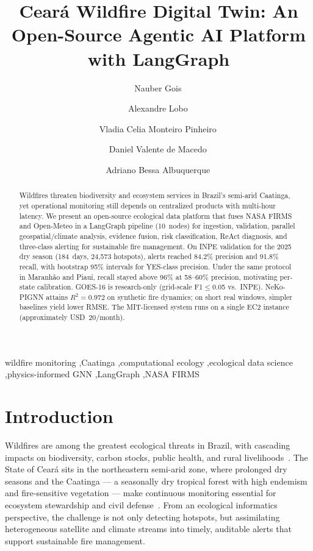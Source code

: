\documentclass[preprint,12pt,times,numbers]{elsarticle}
\title{Ceará Wildfire Digital Twin: An Open-Source Agentic AI Platform with LangGraph}
\author[unifor,cor1]{Nauber Gois\corref{cor1}\,\orcidlink{0000-0001-9361-8659}}
\author[usj]{Alexandre Lobo\,\orcidlink{0009-0000-4099-7878}}
\author[ifce]{Vladia Celia Monteiro Pinheiro\,\orcidlink{0000-0002-9851-8304}}
\author[saxion]{Daniel Valente de Macedo\,\orcidlink{0000-0003-4720-6850}}
\author[unifor]{Adriano Bessa Albuquerque\,\orcidlink{0000-0002-1491-655X}}
\begin{document}
\begin{frontmatter}

\begin{abstract}
Wildfires threaten biodiversity and ecosystem services in Brazil's semi-arid Caatinga, yet operational monitoring still depends on centralized products with multi-hour latency. We present an open-source ecological data platform that fuses NASA FIRMS and Open-Meteo in a LangGraph pipeline (10~nodes) for ingestion, validation, parallel geospatial/climate analysis, evidence fusion, risk classification, ReAct diagnosis, and three-class alerting for sustainable fire management. On INPE validation for the 2025 dry season (184~days, 24{,}573 hotspots), alerts reached 84.2\% precision and 91.8\% recall, with bootstrap 95\% intervals for YES-class precision. Under the same protocol in Maranh\~{a}o and Piau\'{i}, recall stayed above 96\% at 58--60\% precision, motivating per-state calibration. GOES-16 is research-only (grid-scale F1$\leq$0.05 vs.\ INPE). NeKo-PIGNN attains $R^2=0.972$ on synthetic fire dynamics; on short real windows, simpler baselines yield lower RMSE. The MIT-licensed system runs on a single EC2 instance (approximately USD~20/month).
\end{abstract}

\begin{keyword}
wildfire monitoring \sep Caatinga \sep computational ecology \sep ecological data science \sep physics-informed GNN \sep LangGraph \sep NASA FIRMS
\end{keyword}

\end{frontmatter}

\section{Introduction}
\label{sec:intro}

Wildfires are among the greatest ecological threats in Brazil, with cascading impacts on biodiversity, carbon stocks, public health, and rural livelihoods~\cite{article:pivello2021,master:silva2021}. The State of Ceará sits in the northeastern semi-arid zone, where prolonged dry seasons and the Caatinga --- a seasonally dry tropical forest with high endemism and fire-sensitive vegetation --- make continuous monitoring essential for ecosystem stewardship and civil defense~\cite{techreport:funceme2024,article:alencar2022}. From an ecological informatics perspective, the challenge is not only detecting hotspots, but assimilating heterogeneous satellite and climate streams into timely, auditable alerts that support sustainable fire management.
\end{document}
